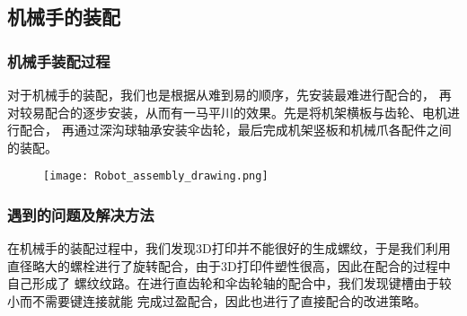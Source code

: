 \subsection{机械手的装配}

\subsubsection{机械手装配过程}

{\songti 对于机械手的装配，我们也是根据从难到易的顺序，先安装最难进行配合的，
再对较易配合的逐步安装，从而有一马平川的效果。先是将机架横板与齿轮、电机进行配合，
再通过深沟球轴承安装伞齿轮，最后完成机架竖板和机械爪各配件之间的装配。}

\begin{figure}[!htp]
    \centering
    \texttt{[image: Robot\_assembly\_drawing.png]}
    \label{fig:机械手装配图}
\end{figure}

\subsubsection{遇到的问题及解决方法}

{\songti 在机械手的装配过程中，我们发现3D打印并不能很好的生成螺纹，于是我们利用
直径略大的螺栓进行了旋转配合，由于3D打印件塑性很高，因此在配合的过程中自己形成了
螺纹纹路。在进行直齿轮和伞齿轮轴的配合中，我们发现键槽由于较小而不需要键连接就能
完成过盈配合，因此也进行了直接配合的改进策略。}
